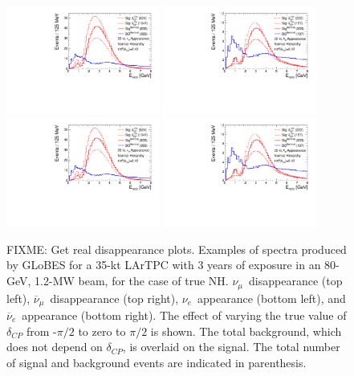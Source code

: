\documentclass[letterpaper,11pt]{article}
\begin{document}
\begin{figure}[!htb]
  \centering
  \includegraphics[width=0.45\textwidth]{figs/spectra_35kt_nue_dcpvar_nh.pdf}
  \includegraphics[width=0.45\textwidth]{figs/spectra_35kt_nuebar_dcpvar_nh.pdf}
  \includegraphics[width=0.45\textwidth]{figs/spectra_35kt_nue_dcpvar_nh.pdf}
  \includegraphics[width=0.45\textwidth]{figs/spectra_35kt_nuebar_dcpvar_nh.pdf}
  \caption{FIXME: Get real disappearance plots.
  Examples of spectra produced by GLoBES for a 35-kt LArTPC with 3 years of 
  exposure in an 80-GeV, 1.2-MW beam, for the case of true NH. 
  $\nu_{\mu}$~disappearance (top left),
  $\overline{\nu}_{\mu}$~disappearance (top right), $\nu_e$~appearance (bottom left),
  and $\overline{\nu}_e$~appearance (bottom right). The effect of varying the true
  value of $\delta_{CP}$ from -$\pi/2$ to zero to $\pi/2$ is shown. The total background,
  which does not depend on $\delta_{CP}$, is overlaid on the signal. The total number
  of signal and background events are indicated in parenthesis.}
  \label{fig:example_spectra}
\end{figure}
\end{document}

